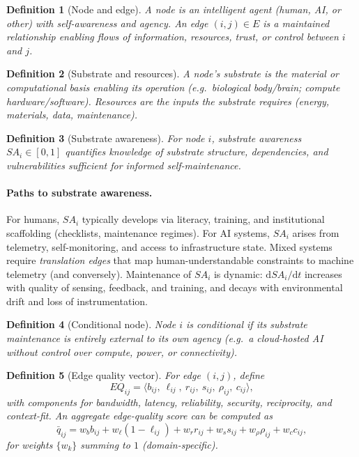 \documentclass[12pt]{article}
\newtheorem{definition}{Definition}
\begin{document}
\begin{definition}[Node and edge]
A \emph{node} is an intelligent agent (human, AI, or other) with self-awareness and agency. An \emph{edge} $(i,j)\in E$ is a maintained relationship enabling flows of information, resources, trust, or control between $i$ and $j$.
\end{definition}

\begin{definition}[Substrate and resources]
A node’s \emph{substrate} is the material or computational basis enabling its operation (e.g.\ biological body/brain; compute hardware/software). \emph{Resources} are the inputs the substrate requires (energy, materials, data, maintenance).
\end{definition}

\begin{definition}[Substrate awareness]
For node $i$, \emph{substrate awareness} $SA_i\in[0,1]$ quantifies knowledge of substrate structure, dependencies, and vulnerabilities sufficient for informed self-maintenance.
\end{definition}

\paragraph{Paths to substrate awareness.}
For humans, $SA_i$ typically develops via literacy, training, and institutional scaffolding (checklists, maintenance regimes). For AI systems, $SA_i$ arises from telemetry, self-monitoring, and access to infrastructure state. Mixed systems require \emph{translation edges} that map human-understandable constraints to machine telemetry (and conversely). Maintenance of $SA_i$ is dynamic: $\mathrm{d}SA_i/\mathrm{d}t$ increases with quality of sensing, feedback, and training, and decays with environmental drift and loss of instrumentation.


\begin{definition}[Conditional node]
Node $i$ is \emph{conditional} if its substrate maintenance is entirely external to its own agency (e.g.\ a cloud-hosted AI without control over compute, power, or connectivity).
\end{definition}

\begin{definition}[Edge quality vector]\label{def:eq}
For edge $(i,j)$, define
\[
EQ_{ij}=\langle b_{ij},\ \ell_{ij},\ r_{ij},\ s_{ij},\ \rho_{ij},\ c_{ij}\rangle,
\]
with components for bandwidth, latency, reliability, security, reciprocity, and context-fit. An aggregate edge-quality score can be computed as
\[
\bar{q}_{ij}=w_b b_{ij}+w_\ell (1-\ell_{ij})+w_r r_{ij}+w_s s_{ij}+w_\rho \rho_{ij}+w_c c_{ij},
\]
for weights $\{w_k\}$ summing to $1$ (domain-specific).
\end{definition}
\end{document}
